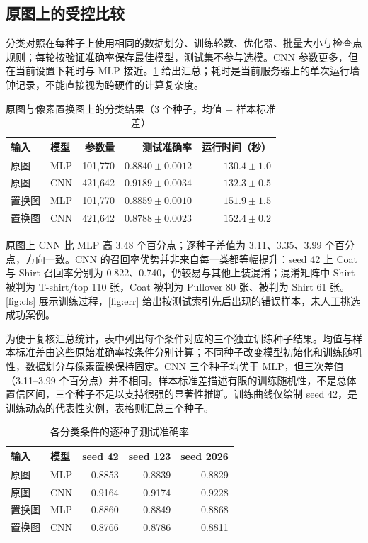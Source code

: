 \documentclass[dvipsnames,svgnames,a4paper,10pt]{article}
\begin{document}
\subsection{原图上的受控比较}
分类对照在每种子上使用相同的数据划分、训练轮数、优化器、批量大小与检查点规则；每轮按验证准确率保存最佳模型，测试集不参与选模。CNN 参数更多，但在当前设置下耗时与 MLP 接近。\cref{tab:cls} 给出汇总；耗时是当前服务器上的单次运行墙钟记录，不能直接视为跨硬件的计算复杂度。
\begin{table}[H]
\centering\small
\caption{原图与像素置换图上的分类结果（3 个种子，均值 $\pm$ 样本标准差）}
\label{tab:cls}
\begin{tabular}{llrrr}
\toprule
输入 & 模型 & 参数量 & 测试准确率 & 运行时间（秒） \\
\midrule
原图 & MLP & 101,770 & $0.8840\pm0.0012$ & $130.4\pm1.0$ \\
原图 & CNN & 421,642 & $0.9189\pm0.0034$ & $132.3\pm0.5$ \\
置换图 & MLP & 101,770 & $0.8859\pm0.0010$ & $151.9\pm1.5$ \\
置换图 & CNN & 421,642 & $0.8788\pm0.0023$ & $152.4\pm0.2$ \\
\bottomrule
\end{tabular}
\end{table}

原图上 CNN 比 MLP 高 3.48 个百分点；逐种子差值为 3.11、3.35、3.99 个百分点，方向一致。CNN 的召回率优势并非来自每一类都等幅提升：seed 42 上 Coat 与 Shirt 召回率分别为 0.822、0.740，仍较易与其他上装混淆；混淆矩阵中 Shirt 被判为 T-shirt/top 110 张，Coat 被判为 Pullover 80 张、被判为 Shirt 61 张。\cref{fig:cls} 展示训练过程，\cref{fig:err} 给出按测试索引先后出现的错误样本，未人工挑选成功案例。

为便于复核汇总统计，表中列出每个条件对应的三个独立训练种子结果。均值与样本标准差由这些原始准确率按条件分别计算；不同种子改变模型初始化和训练随机性，数据划分与像素置换保持固定。CNN 三个种子均优于 MLP，但三次差值（3.11--3.99 个百分点）并不相同。样本标准差描述有限的训练随机性，不是总体置信区间，三个种子不足以支持很强的显著性推断。训练曲线仅绘制 seed 42，是训练动态的代表性实例，表格则汇总三个种子。
\begin{table}[H]
\centering\small
\caption{各分类条件的逐种子测试准确率}
\label{tab:seed-accuracy}
\begin{tabular}{llrrr}
\toprule
输入 & 模型 & seed 42 & seed 123 & seed 2026 \\
\midrule
原图 & MLP & 0.8853 & 0.8839 & 0.8829 \\
原图 & CNN & 0.9164 & 0.9174 & 0.9228 \\
置换图 & MLP & 0.8860 & 0.8849 & 0.8868 \\
置换图 & CNN & 0.8766 & 0.8786 & 0.8811 \\
\bottomrule
\end{tabular}
\end{table}
\end{document}
